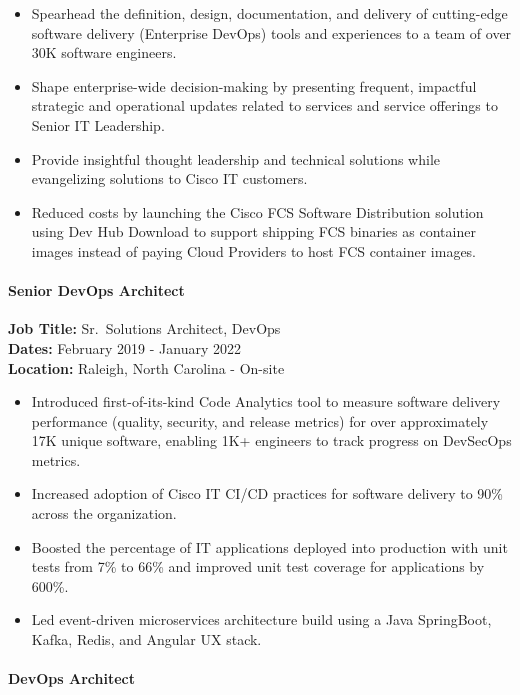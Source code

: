 \documentclass[
]{article}
\providecommand{\tightlist}{%
  \setlength{\itemsep}{0pt}\setlength{\parskip}{0pt}}
\renewcommand{\tightlist}{%
  \setlength{\itemsep}{0.12em}\setlength{\parskip}{0pt}\setlength{\parsep}{0pt}%
}
\begin{document}
\begin{itemize}
\tightlist
\item
  Spearhead the definition, design, documentation, and delivery of
  cutting-edge software delivery (Enterprise DevOps) tools and
  experiences to a team of over 30K software engineers.
\item
  Shape enterprise-wide decision-making by presenting frequent,
  impactful strategic and operational updates related to services and
  service offerings to Senior IT Leadership.
\item
  Provide insightful thought leadership and technical solutions while
  evangelizing solutions to Cisco IT customers.
\item
  Reduced costs by launching the Cisco FCS Software Distribution
  solution using Dev Hub Download to support shipping FCS binaries as
  container images instead of paying Cloud Providers to host FCS
  container images.
\end{itemize}

\paragraph{Senior DevOps Architect}\label{senior-devops-architect}

\textbf{Job Title:} Sr.~Solutions Architect, DevOps\\
\textbf{Dates:} February 2019 - January 2022\\
\textbf{Location:} Raleigh, North Carolina - On-site

\begin{itemize}
\tightlist
\item
  Introduced first-of-its-kind Code Analytics tool to measure software
  delivery performance (quality, security, and release metrics) for over
  approximately 17K unique software, enabling 1K+ engineers to track
  progress on DevSecOps metrics.
\item
  Increased adoption of Cisco IT CI/CD practices for software delivery
  to 90\% across the organization.
\item
  Boosted the percentage of IT applications deployed into production
  with unit tests from 7\% to 66\% and improved unit test coverage for
  applications by 600\%.
\item
  Led event-driven microservices architecture build using a Java
  SpringBoot, Kafka, Redis, and Angular UX stack.
\end{itemize}

\paragraph{DevOps Architect}\label{devops-architect}
\end{document}
